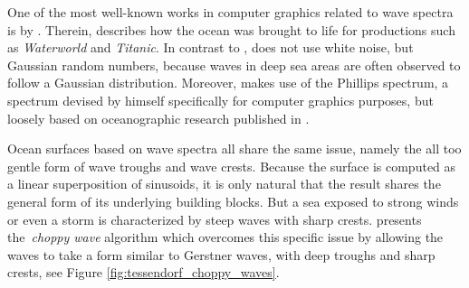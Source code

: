 One of the most well-known works in computer graphics related to wave spectra is
by \citet{course:simulatingocean}. Therein, \citeauthor{course:simulatingocean}
describes how the ocean was brought to life for productions such as
\emph{Waterworld} and \emph{Titanic}. In contrast to \citeauthor{Mastin:1987},
\citeauthor{course:simulatingocean} does not use white noise, but Gaussian
random numbers, because waves in deep sea areas are often observed to follow a
Gaussian distribution. Moreover, \citeauthor{course:simulatingocean}
makes use of the Phillips spectrum, a spectrum devised by himself specifically
for computer graphics purposes, but loosely based on oceanographic research
published in \citet{article:Phillips1958,article:Phillips1985}.

Ocean surfaces based on wave spectra all share the same issue, namely the all too
gentle form of wave troughs and wave crests. Because the surface is computed as
a linear superposition of sinusoids, it is only natural that the result shares
the general form of its underlying building blocks. But a sea exposed to strong
winds or even a storm is characterized by steep waves with sharp crests.
\citet{course:simulatingocean} presents the~\emph{choppy wave} algorithm which
overcomes this specific issue by allowing the waves to take a form similar to
Gerstner waves, with deep troughs and sharp crests, see Figure
\ref{fig:tessendorf_choppy_waves}.

